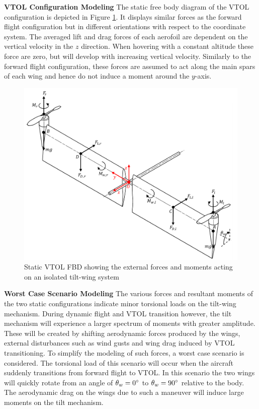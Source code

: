 \textbf{VTOL Configuration Modeling}
The static free body diagram of the VTOL configuration is depicted in Figure \ref{fig:VTOLFBD}. It displays similar forces as the forward flight configuration but in different orientations with respect to the coordinate system. The averaged lift and drag forces of each aerofoil are dependent on the vertical velocity in the $z$ direction. When hovering with a constant altitude these force are zero, but will develop with increasing vertical velocity. Similarly to the forward flight configuration, these forces are assumed to act along the main spars of each wing and hence do not induce a moment around the $y$-axis.\\
\begin{figure}[H]
    \centering
    \includegraphics[width = \textwidth]{Tiltwing/VTOLFBD.png}
    \caption[Static VTOL FBD]{Static VTOL FBD showing the external forces and moments acting on an isolated tilt-wing system}
    \label{fig:VTOLFBD}
\end{figure}

\textbf{Worst Case Scenario Modeling}
The various forces and resultant moments of the two static configurations indicate minor torsional loads on the tilt-wing mechanism. During dynamic flight and VTOL transition however, the tilt mechanism will experience a larger spectrum of moments with greater amplitude. These will be created by shifting aerodynamic forces produced by the wings, external disturbances such as wind gusts and wing drag induced by VTOL transitioning. To simplify the modeling of such forces, a worst case scenario is considered. The torsional load of this scenario will occur when the aircraft suddenly transitions from forward flight to VTOL. In this scenario the two wings will quickly rotate from an angle of \(\theta_w=0\degree\) to \(\theta_w=90\degree\) relative to the body. The aerodynamic drag on the wings due to such a maneuver will induce large moments on the tilt mechanism.\\

